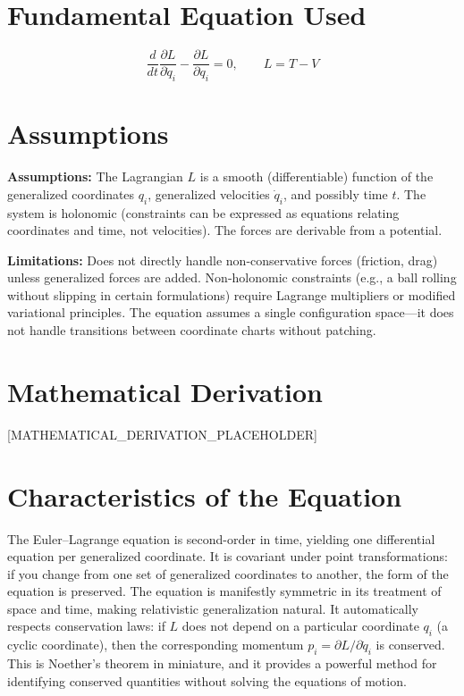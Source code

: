 \documentclass[11pt,openright]{book}
\begin{document}
\section*{Fundamental Equation Used}

\[
\frac{d}{dt}\frac{\partial L}{\partial \dot{q}_i}-\frac{\partial L}{\partial q_i}=0,\qquad L=T-V
\]
\section*{Assumptions}

\textbf{Assumptions:} The Lagrangian $L$ is a smooth (differentiable) function of the generalized coordinates $q_i$, generalized velocities $\dot{q}_i$, and possibly time $t$. The system is holonomic (constraints can be expressed as equations relating coordinates and time, not velocities). The forces are derivable from a potential.


\textbf{Limitations:} Does not directly handle non-conservative forces (friction, drag) unless generalized forces are added. Non-holonomic constraints (e.g., a ball rolling without slipping in certain formulations) require Lagrange multipliers or modified variational principles. The equation assumes a single configuration space---it does not handle transitions between coordinate charts without patching.


\section*{Mathematical Derivation}

[MATHEMATICAL_DERIVATION_PLACEHOLDER]

\section*{Characteristics of the Equation}

The Euler--Lagrange equation is second-order in time, yielding one differential equation per generalized coordinate. It is covariant under point transformations: if you change from one set of generalized coordinates to another, the form of the equation is preserved. The equation is manifestly symmetric in its treatment of space and time, making relativistic generalization natural. It automatically respects conservation laws: if $L$ does not depend on a particular coordinate $q_i$ (a cyclic coordinate), then the corresponding momentum $p_i = \partial L / \partial \dot{q}_i$ is conserved. This is Noether's theorem in miniature, and it provides a powerful method for identifying conserved quantities without solving the equations of motion.
\end{document}
